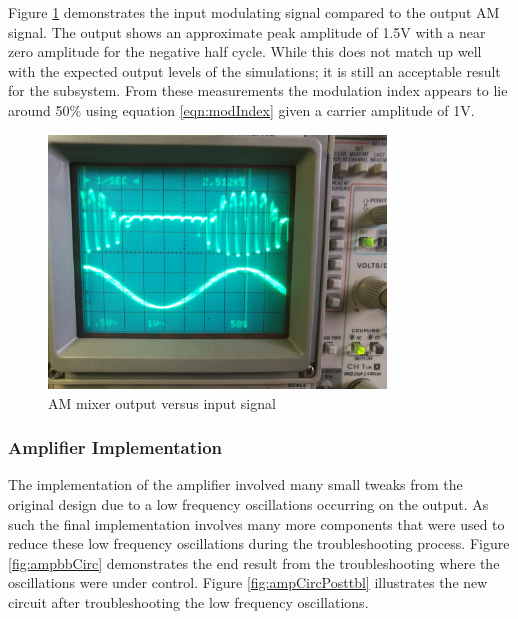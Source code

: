 Figure \ref{fig:mixerinVsout} demonstrates the input modulating signal compared to the output AM signal. The output shows an approximate peak amplitude of 1.5V with a near zero amplitude for the negative half cycle. While this does not match up well with the expected output levels of the simulations; it is still an acceptable result for the subsystem. From these measurements the modulation index appears to lie around 50\% using equation \ref{eqn:modIndex} given a carrier amplitude of 1V.

\begin{figure}[ht!]
    \centering
    \includegraphics[width=0.8\textwidth]{Figures/Implementation/Mixer/mixoutVsin.jpg}
    \setlength{\belowcaptionskip}{-10pt}
    \caption{AM mixer output versus input signal}
    \label{fig:mixerinVsout}
\end{figure}

\subsubsection{Amplifier Implementation}
The implementation of the amplifier involved many small tweaks from the original design due to a low frequency oscillations occurring on the output. As such the final implementation involves many more components that were used to reduce these low frequency oscillations during the troubleshooting process. Figure \ref{fig:ampbbCirc} demonstrates the end result from the troubleshooting where the oscillations were under control. Figure \ref{fig:ampCircPosttbl} illustrates the new circuit after troubleshooting the low frequency oscillations.

